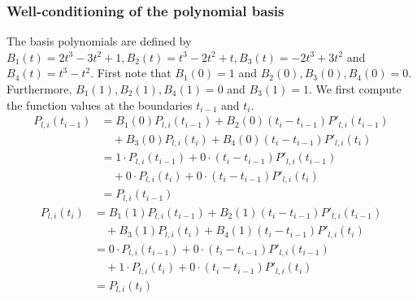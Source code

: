 \subsubsection{Well-conditioning of the polynomial basis}
\label{A:well_conditioning}
The basis polynomials are defined by $B_1(t) = 2t^3 - 3t^2 +1, B_2(t) = t^3 - 2t^2 +t, B_3(t) = -2t^3 + 3t^2$ and $B_4(t) = t^3 - t^2$. First note that $B_1(0) = 1$ and $B_2(0), B_3(0), B_4(0) = 0$. Furthermore, $B_1(1), B_2(1), B_4(1) = 0$ and $B_3(1) = 1$. We first compute the function values at the boundaries $t_{i-1}$ and $t_i$.
\begin{align*}
P_{l,i}(t_{i-1}) &= B_1(0) P_{l,i}(t_{i-1}) + B_2(0) (t_{i} - t_{i-1}) P'_{l,i}(t_{i-1})  \\& \quad + B_3(0) P_{l,i}(t_{i}) + B_4(0) (t_{i} - t_{i-1}) P'_{l,i}(t_{i}) \\
&=  1 \cdot P_{l,i}(t_{i-1}) + 0 \cdot (t_{i} - t_{i-1}) P'_{l,i}(t_{i-1})  \\& \quad + 0 \cdot P_{l,i}(t_{i}) + 0 \cdot (t_{i} - t_{i-1}) P'_{l,i}(t_{i})\\
&= P_{l,i}(t_{i-1}) 
\end{align*}
\begin{align*}
P_{l,i}(t_{i}) &= B_1(1) P_{l,i}(t_{i-1}) + B_2(1) (t_{i} - t_{i-1}) P'_{l,i}(t_{i-1})  \\& \quad + B_3(1) P_{l,i}(t_{i}) + B_4(1) (t_{i} - t_{i-1}) P'_{l,i}(t_{i}) \\ 
&= 0 \cdot P_{l,i}(t_{i-1}) + 0 \cdot (t_{i} - t_{i-1}) P'_{l,i}(t_{i-1})  \\& \quad + 1 \cdot  P_{l,i}(t_{i}) + 0 \cdot (t_{i} - t_{i-1}) P'_{l,i}(t_{i})  \\
&= P_{l,i}(t_{i})
\end{align*}

